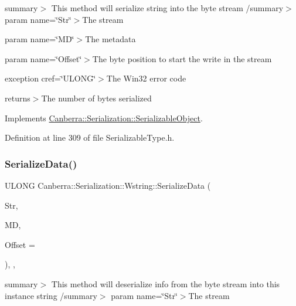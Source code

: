 summary$>$ This method will serialize string into the byte stream /summary$>$ param name=\char`\"{}\+Str\char`\"{}$>$The stream

param name=\char`\"{}\+M\+D\char`\"{}$>$The metadata

param name=\char`\"{}\+Offset\char`\"{}$>$The byte position to start the write in the stream

exception cref=\char`\"{}\+U\+L\+O\+N\+G\char`\"{}$>$The Win32 error code

returns$>$The number of bytes serialized

Implements \hyperlink{class_canberra_1_1_serialization_1_1_serializable_object}{Canberra\+::\+Serialization\+::\+Serializable\+Object}.



Definition at line 309 of file Serializable\+Type.\+h.

\mbox{\label{class_canberra_1_1_serialization_1_1_wstring_a6d71e900d2e8b02fe198b41b392ec5d2_a6d71e900d2e8b02fe198b41b392ec5d2}} 
\subsubsection{\texorpdfstring{Serialize\+Data()}{SerializeData()}}
{\footnotesize\ttfamily U\+L\+O\+NG Canberra\+::\+Serialization\+::\+Wstring\+::\+Serialize\+Data (\begin{DoxyParamCaption}\item[{\hyperlink{class_canberra_1_1_utility_1_1_core_1_1_byte_stream}{Canberra\+::\+Utility\+::\+Core\+::\+Byte\+Stream} \&}]{Str,  }\item[{const \hyperlink{class_canberra_1_1_serialization_1_1_meta_data}{Meta\+Data} \&}]{MD,  }\item[{const L\+O\+NG}]{Offset = {} }\end{DoxyParamCaption})\hspace{0.3cm}{\ttfamily [inline]}, {\ttfamily [protected]}, {\ttfamily [virtual]}}

summary$>$ This method will deserialize info from the byte stream into this instance string /summary$>$ param name=\char`\"{}\+Str\char`\"{}$>$The stream

